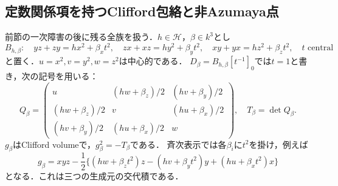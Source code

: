 \subsection{定数関係項を持つClifford包絡と非Azumaya点}
\label{sec:clifford-beta-full}
前節の一次障害の後に残る全族を扱う．$h\in\mathcal H$，$\beta\in k^3$とし
\[
 B_{h,\beta}:
 \quad yz+zy=h x^2+\beta_xt^2,\quad zx+xz=h y^2+\beta_yt^2,\quad
 xy+yx=h z^2+\beta_zt^2,\quad t\text{ central}
\]
と置く．$u=x^2,v=y^2,w=z^2$は中心的である．
$D_\beta=B_{h,\beta}[t^{-1}]_0$では$t=1$と書き，次の記号を用いる：
\[
 Q_\beta=\begin{pmatrix}
 u&(hw+\beta_z)/2&(hv+\beta_y)/2\\
 (hw+\beta_z)/2&v&(hu+\beta_x)/2\\
 (hv+\beta_y)/2&(hu+\beta_x)/2&w
 \end{pmatrix},\quad T_\beta=\det Q_\beta.
\]
$g_\beta$はClifford volumeで，$g_\beta^2=-T_\beta$である．
斉次表示では各$\beta_i$に$t^2$を掛け，例えば
\[
 g_\beta=xyz-\frac12\{(hw+\beta_zt^2)z-(hv+\beta_yt^2)y+(hu+\beta_xt^2)x\}
\]
となる．これは三つの生成元の交代積である．

